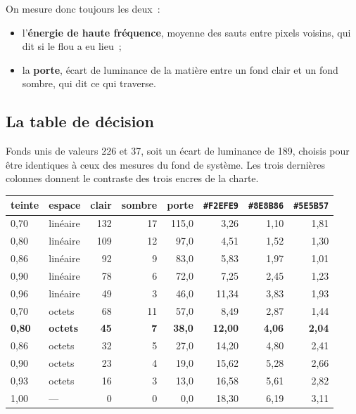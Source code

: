 \documentclass[11pt,a4paper]{article}
\newcommand{\uni}[1]{\texttt{#1}}
\newcommand{\np}[1]{#1}
\begin{document}
On mesure donc toujours les deux~:
\begin{itemize}
\item l'\textbf{énergie de haute fréquence}, moyenne des sauts entre pixels
voisins, qui dit si le flou a eu lieu~;
\item la \textbf{porte}, écart de luminance de la matière entre un fond clair
et un fond sombre, qui dit ce qui traverse.
\end{itemize}

\subsection{La table de décision}

Fonds unis de valeurs 226 et 37, soit un écart de luminance de 189, choisis
pour être identiques à ceux des mesures du fond de système. Les trois dernières
colonnes donnent le contraste des trois encres de la charte.

\begin{center}
\small
\begin{tabular}{llrrrrrr}
\toprule
teinte & espace & clair & sombre & porte & \uni{\#F2EFE9} & \uni{\#8E8B86} & \uni{\#5E5B57} \\
\midrule
\np{0,70} & linéaire & 132 & 17 & \np{115,0} & \np{3,26} & \np{1,10} & \np{1,81} \\
\np{0,80} & linéaire & 109 & 12 & \np{97,0} & \np{4,51} & \np{1,52} & \np{1,30} \\
\np{0,86} & linéaire & 92 & 9 & \np{83,0} & \np{5,83} & \np{1,97} & \np{1,01} \\
\np{0,90} & linéaire & 78 & 6 & \np{72,0} & \np{7,25} & \np{2,45} & \np{1,23} \\
\np{0,96} & linéaire & 49 & 3 & \np{46,0} & \np{11,34} & \np{3,83} & \np{1,93} \\
\midrule
\np{0,70} & octets & 68 & 11 & \np{57,0} & \np{8,49} & \np{2,87} & \np{1,44} \\
\textbf{\np{0,80}} & \textbf{octets} & \textbf{45} & \textbf{7} & \textbf{\np{38,0}} & \textbf{\np{12,00}} & \textbf{\np{4,06}} & \textbf{\np{2,04}} \\
\np{0,86} & octets & 32 & 5 & \np{27,0} & \np{14,20} & \np{4,80} & \np{2,41} \\
\np{0,90} & octets & 23 & 4 & \np{19,0} & \np{15,62} & \np{5,28} & \np{2,66} \\
\np{0,93} & octets & 16 & 3 & \np{13,0} & \np{16,58} & \np{5,61} & \np{2,82} \\
\midrule
\np{1,00} & --- & 0 & 0 & \np{0,0} & \np{18,30} & \np{6,19} & \np{3,11} \\
\bottomrule
\end{tabular}
\end{center}
\end{document}
